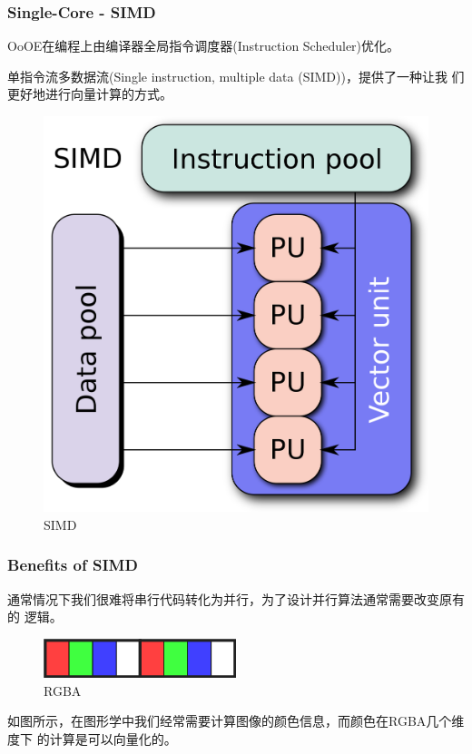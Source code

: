 \documentclass[aspectratio=169]{ctexbeamer}
\begin{document}
\begin{frame}
    \frametitle{Single-Core - SIMD}

    OoOE在编程上由编译器全局指令调度器(Instruction Scheduler)优化。

    单指令流多数据流(Single instruction, multiple data (SIMD))，提供了一种让我
    们更好地进行向量计算的方式。

    \begin{figure}
        \centering
        \includegraphics[height=0.5\textheight]{images/SIMD2.svg.png}
        \caption{SIMD}
    \end{figure}

\end{frame}

\begin{frame}
    \frametitle{Benefits of SIMD}

    通常情况下我们很难将串行代码转化为并行，为了设计并行算法通常需要改变原有的
    逻辑。

    \begin{figure}[h]
        \centering
        \includegraphics[width=0.5\textwidth]{images/rgba.png}
        \caption{RGBA}
    \end{figure}

    如图所示，在图形学中我们经常需要计算图像的颜色信息，而颜色在RGBA几个维度下
    的计算是可以向量化的。

\end{frame}
\end{document}
